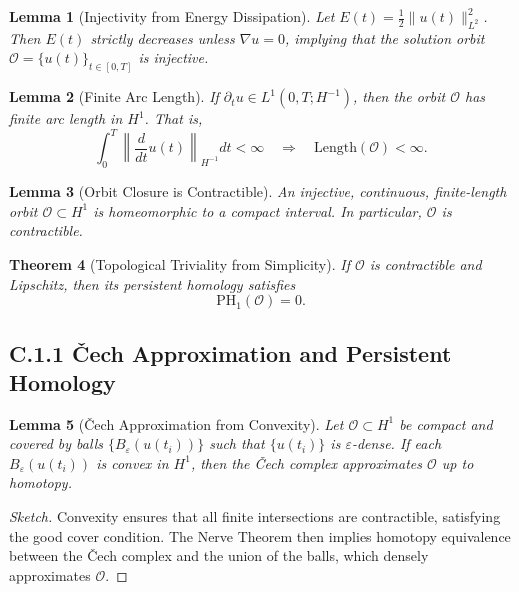 \documentclass[11pt]{article}
\newtheorem{theorem}{Theorem}[section]
\newtheorem{lemma}[theorem]{Lemma}
\theoremstyle{definition}
\begin{document}
\begin{lemma}[Injectivity from Energy Dissipation]
Let \( E(t) = \frac{1}{2} \|u(t)\|_{L^2}^2 \). Then \( E(t) \) strictly decreases unless \( \nabla u = 0 \), implying that the solution orbit \( \mathcal{O} = \{ u(t) \}_{t \in [0,T]} \) is injective.
\end{lemma}

\begin{lemma}[Finite Arc Length]
If \( \partial_t u \in L^1(0, T; H^{-1}) \), then the orbit \( \mathcal{O} \) has finite arc length in \( H^1 \). That is,
\[
\int_0^T \left\| \frac{d}{dt} u(t) \right\|_{H^{-1}} dt < \infty \quad \Rightarrow \quad \text{Length}(\mathcal{O}) < \infty.
\]
\end{lemma}

\begin{lemma}[Orbit Closure is Contractible]
An injective, continuous, finite-length orbit \( \mathcal{O} \subset H^1 \) is homeomorphic to a compact interval. In particular, \( \mathcal{O} \) is contractible.
\end{lemma}

\begin{theorem}[Topological Triviality from Simplicity]
If \( \mathcal{O} \) is contractible and Lipschitz, then its persistent homology satisfies
\[
\mathrm{PH}_1(\mathcal{O}) = 0.
\]
\end{theorem}

\subsection*{C.1.1 Čech Approximation and Persistent Homology}

\begin{lemma}[Čech Approximation from Convexity]
Let \( \mathcal{O} \subset H^1 \) be compact and covered by balls \( \{ B_\varepsilon(u(t_i)) \} \) such that \( \{ u(t_i) \} \) is \( \varepsilon \)-dense. If each \( B_\varepsilon(u(t_i)) \) is convex in \( H^1 \), then the Čech complex approximates \( \mathcal{O} \) up to homotopy.
\end{lemma}

\begin{proof}[Sketch]
Convexity ensures that all finite intersections are contractible, satisfying the good cover condition. The Nerve Theorem then implies homotopy equivalence between the Čech complex and the union of the balls, which densely approximates \( \mathcal{O} \).
\end{proof}
\end{document}
